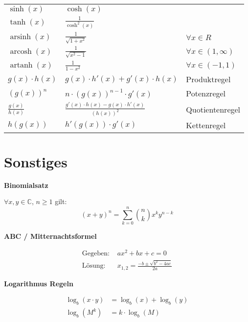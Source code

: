 \documentclass[25pt]{sciposter}
\newenvironment{method}[1]{\begin{mdframed}[backgroundcolor=blue!10,innertopmargin=15pt, innerbottommargin=15pt,nobreak=true]
		\textbf{#1 }
	}
	{ 
	\end{mdframed}
}
\begin{document}
\begin{multicols}{3}
{\begin{table}[]
\begin{tabular}{@{} p{} p{} p{} @{}}
			$\sinh(x)$ & $\cosh(x)$ & \\
			$\tanh(x)$ & $\frac{1}{\cosh^2(x)}$ & \\
			$\operatorname{arsinh}(x)$ & $\frac{1}{\sqrt{1+x^2}}$ & $\forall x \in R$\\
			$\operatorname{arcosh}(x)$ & $\frac{1}{\sqrt{x^2 - 1}}$ & $\forall x \in (1, \infty)$\\		  $\operatorname{artanh}(x)$ & $\frac{1}{1-x^2}$ & $\forall x \in (-1,1)$\\
			\midrule
			$g(x) \cdot h(x)$ & $g(x) \cdot h'(x) + g'(x) \cdot h(x)$ & Produktregel\\
			$\left(g(x)\right)^n$ & $n \cdot \left( g(x) \right)^{n-1} \cdot g'(x)$ & Potenzregel\\
			$\frac{g(x)}{h(x)}$ & $\frac{ g'(x) \cdot h(x) - g(x)\cdot h'(x)}{\left(h(x)\right) ^2}$ & Quotientenregel\\
			$h(g(x))$ & $h'(g(x)) \cdot g'(x)$ & Kettenregel\\
			\bottomrule
		\end{tabular}
	\end{table}
}











\section*{Sonstiges}
\begin{method}{Binomialsatz}
	$\forall x,y \in \mathbb{C}$, $n \geq 1$ gilt:
	$$(x+y)^n = \sum_{k=0}^{n} \binom{n}{k}x^k y^{n-k}$$
\end{method}

\begin{method}{ABC / Mitternachtsformel}
	\begin{align*}
	\text{Gegeben: } & ax^2 + bx + c = 0\\
	\text{Lösung: } & x_{1,2} = \frac{-b \pm \sqrt{b^2 -4ac}}{2a}
	\end{align*}
\end{method}


\begin{method}{Logarithmus Regeln}
\begin{align*}
	 \log _{b}(x\cdot y) &= \log _{b}(x)+\log _{b}(y)\\
	 \log_{b} (M^k) &= k \cdot \log_b (M)
\end{align*}
\end{method}



\end{multicols}
\end{document}
